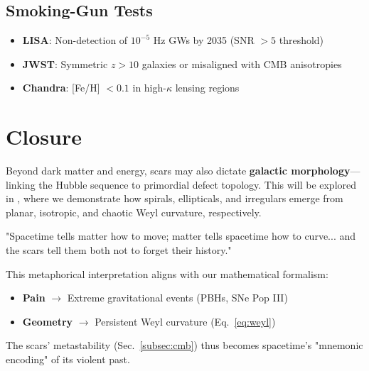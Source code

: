 \documentclass{article}
\begin{document}
\subsection{Smoking-Gun Tests}
\FloatBarrier
\label{subsec:smokinggun}
  \begin{tcolorbox}[colback=boxnormal,
    colframe=blue!50!black,
    title=\textbf{Definitive Falsification Tests}
]
\begin{itemize}
    \item \textbf{LISA}: Non-detection of $10^{-5}$ Hz GWs by 2035 (SNR $> 5$ threshold)  
    \item \textbf{JWST}: Symmetric $z > 10$ galaxies or misaligned with CMB anisotropies  
    \item \textbf{Chandra}: [Fe/H] $< 0.1$ in high-$\kappa$ lensing regions  
\end{itemize}
\end{tcolorbox}


\section{Closure}
\label{sec:closure}
\vspace{0.5cm}

Beyond dark matter and energy, scars may also dictate \textbf{galactic morphology}—linking the Hubble sequence to primordial defect topology. This will be explored in \cite{Bertran2024ScarredHubble}, where we demonstrate how spirals, ellipticals, and irregulars emerge from planar, isotropic, and chaotic Weyl curvature, respectively.

\begin{center}
\begin{tcolorbox}[
    colback=boxnormal,
    colframe=blue!50!black,
    boxrule=1pt,
    arc=4pt,
    width=0.9\linewidth,
    fontupper=\itshape
]
\centering
"Spacetime tells matter how to move; matter tells spacetime how to curve... and the scars tell them both not to forget their history."
\end{tcolorbox}
\end{center}
\vspace{0.3cm}

This metaphorical interpretation aligns with our mathematical formalism:  
\begin{itemize}
    \item \textbf{Pain} $\rightarrow$ Extreme gravitational events (PBHs, SNe Pop III)
    \item \textbf{Geometry} $\rightarrow$ Persistent Weyl curvature (Eq.~\ref{eq:weyl})
\end{itemize}
The scars' metastability (Sec.~\ref{subsec:cmb}) thus becomes spacetime's "mnemonic encoding" of its violent past. 
\end{document}
